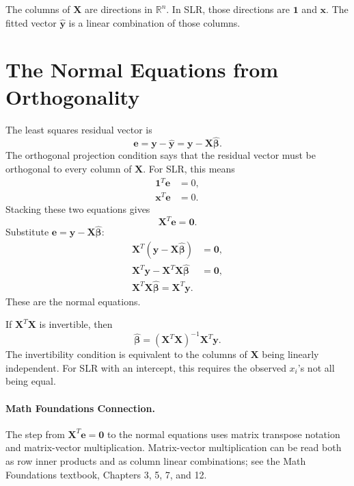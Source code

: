 The columns of \(\mathbf{X}\) are directions in \(\mathbb{R}^n\).  In SLR, those directions are \(\mathbf{1}\) and \(\mathbf{x}\).  The fitted vector \(\widehat{\mathbf{y}}\) is a linear combination of those columns.

\section{The Normal Equations from Orthogonality}

The least squares residual vector is
\begin{equation}
  \mathbf{e}=\mathbf{y}-\widehat{\mathbf{y}}
  =\mathbf{y}-\mathbf{X}\widehat{\boldsymbol{\beta}}.
\end{equation}
The orthogonal projection condition says that the residual vector must be orthogonal to every column of \(\mathbf{X}\).  For SLR, this means
\begin{align}
  \mathbf{1}^T\mathbf{e} &= 0, \\
  \mathbf{x}^T\mathbf{e} &= 0.
\end{align}
Stacking these two equations gives
\begin{equation}
  \mathbf{X}^T\mathbf{e}=\mathbf{0}.
\end{equation}
Substitute \(\mathbf{e}=\mathbf{y}-\mathbf{X}\widehat{\boldsymbol{\beta}}\):
\begin{align}
  \mathbf{X}^T(\mathbf{y}-\mathbf{X}\widehat{\boldsymbol{\beta}})&=\mathbf{0}, \\
  \mathbf{X}^T\mathbf{y}-\mathbf{X}^T\mathbf{X}\widehat{\boldsymbol{\beta}}&=\mathbf{0}, \\
  \boxed{\mathbf{X}^T\mathbf{X}\widehat{\boldsymbol{\beta}}=\mathbf{X}^T\mathbf{y}.}
  \label{eq:ch7-normal-equations}
\end{align}
These are the normal equations.

If \(\mathbf{X}^T\mathbf{X}\) is invertible, then
\begin{equation}
  \boxed{\widehat{\boldsymbol{\beta}}=(\mathbf{X}^T\mathbf{X})^{-1}\mathbf{X}^T\mathbf{y}.}
  \label{eq:ch7-beta-hat}
\end{equation}
The invertibility condition is equivalent to the columns of \(\mathbf{X}\) being linearly independent.  For SLR with an intercept, this requires the observed \(x_i\)'s not all being equal.

\paragraph{Math Foundations Connection.}
The step from \(\mathbf{X}^T\mathbf{e}=\mathbf{0}\) to the normal equations uses matrix transpose notation and matrix-vector multiplication.  Matrix-vector multiplication can be read both as row inner products and as column linear combinations; see the Math Foundations textbook, Chapters 3, 5, 7, and 12.

